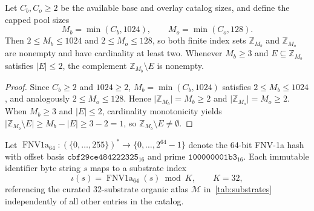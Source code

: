 \documentclass[11pt,a4paper]{article}
\theoremstyle{plain}
\theoremstyle{definition}
\theoremstyle{remark}
\newcommand{\Z}{\mathbb{Z}}
\newcommand{\Atlas}{\mathcal{M}}
\newcommand{\FNV}{\operatorname{FNV1a}_{64}}
\begin{document}
\begin{proposition}\label{prop:chem-budget}
  Let \( C_b, C_o \ge 2 \) be the available base and overlay catalog sizes, and define
  the capped pool sizes
  \begin{equation}\label{eq:chem-pool-cap}
    M_b = \min(C_b, 1024), \qquad M_o = \min(C_o, 128).
  \end{equation}
  Then \( 2 \le M_b \le 1024 \) and \( 2 \le M_o \le 128 \), so both finite index sets
  \( \Z_{M_b} \) and \( \Z_{M_o} \) are nonempty and have cardinality at least two.
  Whenever \( M_b \ge 3 \) and \( E \subseteq \Z_{M_b} \) satisfies \( \lvert E \rvert \le 2 \),
  the complement \( \Z_{M_b} \setminus E \) is nonempty.
\end{proposition}
\begin{proof}
  Since \( C_b \ge 2 \) and \( 1024 \ge 2 \), \( M_b = \min(C_b, 1024) \) satisfies
  \( 2 \le M_b \le 1024 \), and analogously \( 2 \le M_o \le 128 \). Hence
  \( \lvert \Z_{M_b} \rvert = M_b \ge 2 \) and \( \lvert \Z_{M_o} \rvert = M_o \ge 2 \). When
  \( M_b \ge 3 \) and \( \lvert E \rvert \le 2 \), cardinality monotonicity yields
  \( \lvert \Z_{M_b} \setminus E \rvert \ge M_b - \lvert E \rvert \ge 3 - 2 = 1 \), so
  \( \Z_{M_b} \setminus E \neq \emptyset \).
\end{proof}

\begin{definition}\label{def:substrate-map}
  Let \( \FNV : {(\{0,\dots,255\})}^* \to \{0, \dots, 2^{64} - 1\} \) denote the 64-bit FNV-1a
  hash with offset basis \( \texttt{cbf29ce484222325}_{16} \) and prime
  \( \texttt{100000001b3}_{16} \).
  Each immutable identifier byte string \( s \) maps to a substrate index
  \begin{equation}\label{eq:substrate-index}
    \iota(s) = \FNV(s) \bmod K, \qquad K = 32,
  \end{equation}
  referencing the curated \( 32 \)-substrate organic atlas \( \Atlas \) in~\cref{tab:substrates}
  independently of all other entries in the catalog.
\end{definition}
\end{document}
